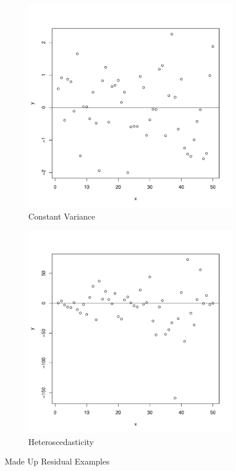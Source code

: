 \documentclass[11pt,openany]{book}
\begin{document}
\begin{figure}
        \centering
        \begin{subfigure}[b]{0.45\textwidth}
                \centering
                \includegraphics[width=\textwidth]{../15_Diagnostics/convar.pdf}%
                \caption{Constant Variance \label{fig:convar15}}
        \end{subfigure}
        \begin{subfigure}[b]{0.45\textwidth}
                \centering
                \includegraphics[width=\textwidth]{../15_Diagnostics/heterovar.pdf}%
                \caption{Heteroscedasticity \label{fig:hetero15}}
        \end{subfigure}
        \caption{Made Up Residual Examples}
\end{figure}  
\end{document}
